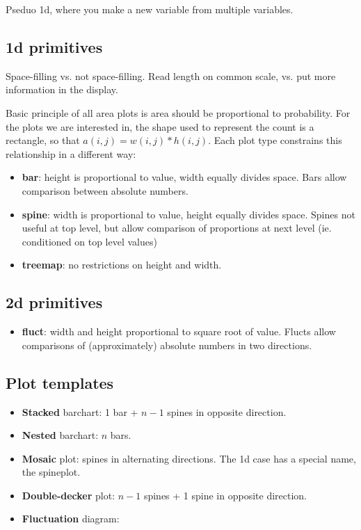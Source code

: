 \documentclass[letterpaper,oneside]{scrartcl}
\begin{document}
Pseduo 1d, where you make a new variable from multiple variables.

\subsection{1d primitives}

Space-filling vs. not space-filling.  Read length on common scale, vs. put more information in the display.

Basic principle of all area plots is area should be proportional to probability. For the plots we are interested in, the shape used to represent the count is a rectangle, so that $a(i, j) = w(i, j) * h(i, j)$. Each plot type constrains this relationship in a different way:

\begin{itemize}
  \item {\bf bar}: height is proportional to value, width equally divides space. Bars allow comparison between absolute numbers.

  \item {\bf spine}: width is proportional to value, height equally divides space. Spines not useful at top level, but allow comparison of proportions at next level (ie. conditioned on top level values)

  \item {\bf treemap}: no restrictions on height and width.

\end{itemize}

\subsection{2d primitives}

\begin{itemize}
  \item {\bf fluct}: width and height proportional to square root of value. Flucts allow comparisons of (approximately) absolute numbers in two directions. 
  
\end{itemize}

\subsection{Plot templates}

\begin{itemize}
  \item {\bf Stacked} barchart: 1 bar + $n-1$ spines in opposite direction.
  \item {\bf Nested} barchart: $n$ bars.
  \item {\bf Mosaic} plot: spines in alternating directions.  The 1d case has a special name, the spineplot.
  \item {\bf Double-decker} plot: $n-1$ spines + 1 spine in opposite direction.
  
  \item {\bf Fluctuation} diagram: 
\end{itemize}
\end{document}

